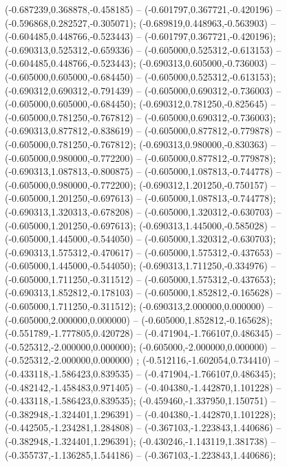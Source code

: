  (-0.687239,0.368878,-0.458185) -- (-0.601797,0.367721,-0.420196) -- (-0.596868,0.282527,-0.305071);
 (-0.689819,0.448963,-0.563903) -- (-0.604485,0.448766,-0.523443) -- (-0.601797,0.367721,-0.420196);
 (-0.690313,0.525312,-0.659336) -- (-0.605000,0.525312,-0.613153) -- (-0.604485,0.448766,-0.523443);
 (-0.690313,0.605000,-0.736003) -- (-0.605000,0.605000,-0.684450) -- (-0.605000,0.525312,-0.613153);
 (-0.690312,0.690312,-0.791439) -- (-0.605000,0.690312,-0.736003) -- (-0.605000,0.605000,-0.684450);
 (-0.690312,0.781250,-0.825645) -- (-0.605000,0.781250,-0.767812) -- (-0.605000,0.690312,-0.736003);
 (-0.690313,0.877812,-0.838619) -- (-0.605000,0.877812,-0.779878) -- (-0.605000,0.781250,-0.767812);
 (-0.690313,0.980000,-0.830363) -- (-0.605000,0.980000,-0.772200) -- (-0.605000,0.877812,-0.779878);
 (-0.690313,1.087813,-0.800875) -- (-0.605000,1.087813,-0.744778) -- (-0.605000,0.980000,-0.772200);
 (-0.690312,1.201250,-0.750157) -- (-0.605000,1.201250,-0.697613) -- (-0.605000,1.087813,-0.744778);
 (-0.690313,1.320313,-0.678208) -- (-0.605000,1.320312,-0.630703) -- (-0.605000,1.201250,-0.697613);
 (-0.690313,1.445000,-0.585028) -- (-0.605000,1.445000,-0.544050) -- (-0.605000,1.320312,-0.630703);
 (-0.690313,1.575312,-0.470617) -- (-0.605000,1.575312,-0.437653) -- (-0.605000,1.445000,-0.544050);
 (-0.690313,1.711250,-0.334976) -- (-0.605000,1.711250,-0.311512) -- (-0.605000,1.575312,-0.437653);
 (-0.690313,1.852812,-0.178103) -- (-0.605000,1.852812,-0.165628) -- (-0.605000,1.711250,-0.311512);
 (-0.690313,2.000000,0.000000) -- (-0.605000,2.000000,0.000000) -- (-0.605000,1.852812,-0.165628);
 (-0.551789,-1.777805,0.420728) -- (-0.471904,-1.766107,0.486345) -- (-0.525312,-2.000000,0.000000);
 (-0.605000,-2.000000,0.000000) -- (-0.525312,-2.000000,0.000000) ;
 (-0.512116,-1.602054,0.734410) -- (-0.433118,-1.586423,0.839535) -- (-0.471904,-1.766107,0.486345);
 (-0.482142,-1.458483,0.971405) -- (-0.404380,-1.442870,1.101228) -- (-0.433118,-1.586423,0.839535);
 (-0.459460,-1.337950,1.150751) -- (-0.382948,-1.324401,1.296391) -- (-0.404380,-1.442870,1.101228);
 (-0.442505,-1.234281,1.284808) -- (-0.367103,-1.223843,1.440686) -- (-0.382948,-1.324401,1.296391);
 (-0.430246,-1.143119,1.381738) -- (-0.355737,-1.136285,1.544186) -- (-0.367103,-1.223843,1.440686);
